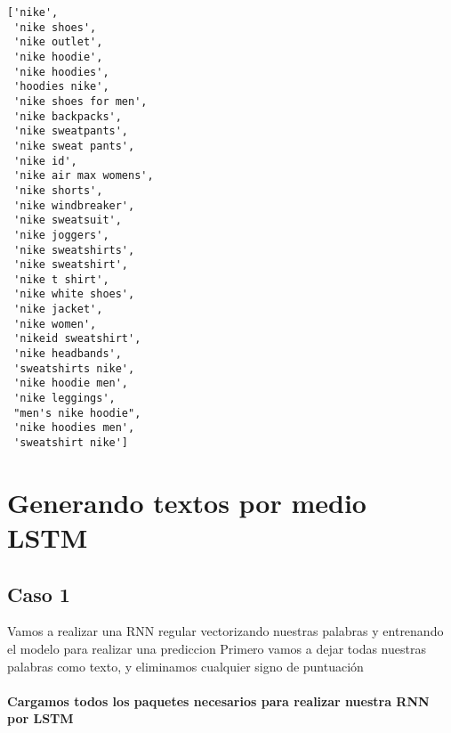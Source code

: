 \documentclass[11pt]{article}
\makeatletter
\newcommand{\boxspacing}{\kern\kvtcb@left@rule\kern\kvtcb@boxsep}
\newcommand{\prompt}[4]{
        \ttfamily\llap{{\color{#2}[#3]:\hspace{3pt}#4}}\vspace{-\baselineskip}
    }
\makeatother
\begin{document}
            \begin{tcolorbox}[breakable, size=fbox, boxrule=.5pt, pad at break*=1mm, opacityfill=0]
\prompt{Out}{outcolor}{26}{\boxspacing}
\begin{Verbatim}[commandchars=\\\{\}]
['nike',
 'nike shoes',
 'nike outlet',
 'nike hoodie',
 'nike hoodies',
 'hoodies nike',
 'nike shoes for men',
 'nike backpacks',
 'nike sweatpants',
 'nike sweat pants',
 'nike id',
 'nike air max womens',
 'nike shorts',
 'nike windbreaker',
 'nike sweatsuit',
 'nike joggers',
 'nike sweatshirts',
 'nike sweatshirt',
 'nike t shirt',
 'nike white shoes',
 'nike jacket',
 'nike women',
 'nikeid sweatshirt',
 'nike headbands',
 'sweatshirts nike',
 'nike hoodie men',
 'nike leggings',
 "men's nike hoodie",
 'nike hoodies men',
 'sweatshirt nike']
\end{Verbatim}
\end{tcolorbox}
        
    \hypertarget{generando-textos-por-medio-lstm}{%
\section{Generando textos por medio
LSTM}\label{generando-textos-por-medio-lstm}}

    \hypertarget{caso-1}{%
\subsection{Caso 1}\label{caso-1}}

Vamos a realizar una RNN regular vectorizando nuestras palabras y
entrenando el modelo para realizar una prediccion Primero vamos a dejar
todas nuestras palabras como texto, y eliminamos cualquier signo de
puntuación

    \hypertarget{cargamos-todos-los-paquetes-necesarios-para-realizar-nuestra-rnn-por-lstm}{%
\paragraph{Cargamos todos los paquetes necesarios para realizar nuestra
RNN por
LSTM}\label{cargamos-todos-los-paquetes-necesarios-para-realizar-nuestra-rnn-por-lstm}}
\end{document}
